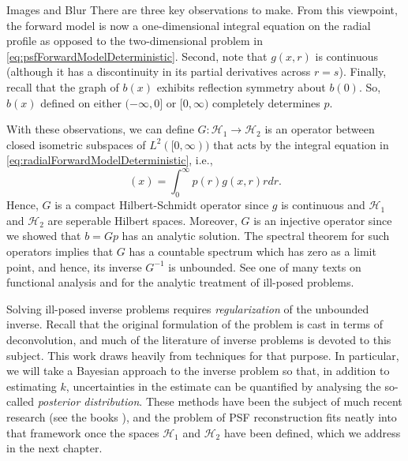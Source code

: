 \begin{chapter}{Images and Blur}
  There are three key observations to make.
  From this viewpoint, the forward model is now a one-dimensional integral equation on the radial profile as opposed to the two-dimensional problem in \eqref{eq:psfForwardModelDeterministic}.
  Second, note that $g(x,r)$ is continuous (although it has a discontinuity in its partial derivatives across $r=s$).
  Finally, recall that the graph of $b(x)$ exhibits reflection symmetry about $b(0)$.
  So, $b(x)$ defined on either $(-\infty,0]$ or $[0,\infty)$ completely determines $p$.

  With these observations, we can define $G: \mathcal H_1 \to \mathcal H_2$ is an operator between closed isometric subspaces of $L^2([0,\infty))$ that acts by the integral equation in \eqref{eq:radialForwardModelDeterministic}, i.e., 
  \begin{equation}
    [Gp](x) = \int_0^\infty p(r) g(x,r) r dr.
  \end{equation}
  Hence, $G$ is a compact Hilbert-Schmidt operator since $g$ is continuous and $\mathcal H_1$ and $\mathcal H_2$ are seperable Hilbert spaces.
  Moreover, $G$ is an injective operator since we showed that $b = Gp$ has an analytic solution. 
  The spectral theorem for such operators implies that $G$ has a countable spectrum which has zero as a limit point, and hence, its inverse $G^{-1}$ is unbounded. %
  See one of many texts on functional analysis \citep{bachman1966,rudin1991} and \citep{tikhonov1963,vogel2002,morozov1993} for the analytic treatment of ill-posed problems.

  Solving ill-posed inverse problems requires \emph{regularization} of the unbounded inverse.
  Recall that the original formulation of the problem is cast in terms of deconvolution, and much of the literature of inverse problems is devoted to this subject.
  This work draws heavily from techniques for that purpose. 
  In particular, we will take a Bayesian approach to the inverse problem so that, in addition to estimating $k$, uncertainties in the estimate can be quantified by analysing the so-called \emph{posterior distribution}.
  These methods have been the subject of much recent research (see the books \citep{calvetti2007introduction,kaipo2005,stuart2010}), and the problem of PSF reconstruction fits neatly into that framework once the spaces $\mathcal H_1$ and $\mathcal H_2$ have been defined, which we address in the next chapter.

\end{chapter}
